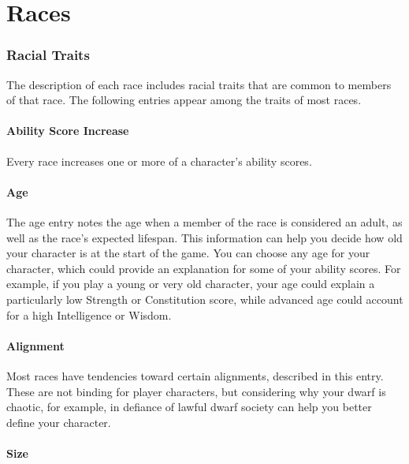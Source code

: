\documentclass[
]{article}
\date{}
\begin{document}
\hypertarget{races}{%
\section{Races}\label{races}}

\hypertarget{racial-traits}{%
\subsubsection{Racial Traits}\label{racial-traits}}

The description of each race includes racial traits that are common to
members of that race. The following entries appear among the traits of
most races.

\hypertarget{ability-score-increase}{%
\paragraph{Ability Score Increase}\label{ability-score-increase}}

Every race increases one or more of a character's ability scores.

\hypertarget{age}{%
\paragraph{Age}\label{age}}

The age entry notes the age when a member of the race is considered an
adult, as well as the race's expected lifespan. This information can
help you decide how old your character is at the start of the game. You
can choose any age for your character, which could provide an
explanation for some of your ability scores. For example, if you play a
young or very old character, your age could explain a particularly low
Strength or Constitution score, while advanced age could account for a
high Intelligence or Wisdom.

\hypertarget{alignment}{%
\paragraph{Alignment}\label{alignment}}

Most races have tendencies toward certain alignments, described in this
entry. These are not binding for player characters, but considering why
your dwarf is chaotic, for example, in defiance of lawful dwarf society
can help you better define your character.

\hypertarget{size}{%
\paragraph{Size}\label{size}}
\end{document}
